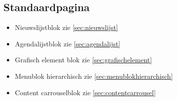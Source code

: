 \subsection{Standaardpagina}
\label{sec:standaardpagina}

\begin{itemize}
  \item Nieuwslijstblok zie \ref{sec:nieuwslijst}
  \item Agendalijstblok zie \ref{sec:agendalijst}
  \item Grafisch element blok zie \ref{sec:grafischelement}
  \item Menublok hierarchisch zie \ref{sec:menublokhierarchisch}
  \item Content carrouselblok zie \ref{sec:contentcarrousel}
\end{itemize}
